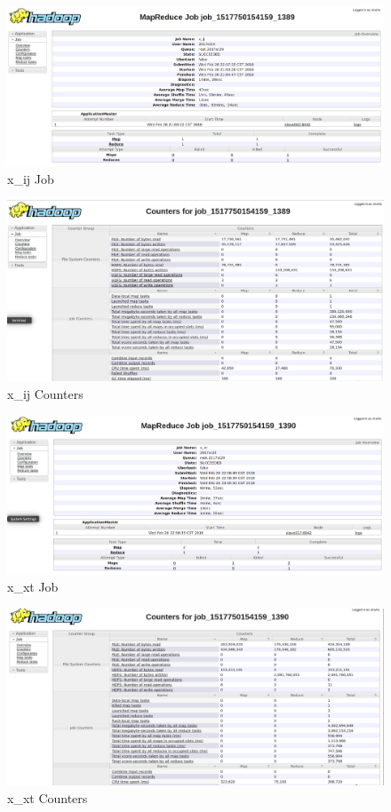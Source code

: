 \documentclass[a4paper,UTF8]{article}
\theoremstyle{definition}
\begin{document}
\begin{figure}[H]
	\centering
	\includegraphics[width=\textwidth]{pic/389_x_ij_job.png}
	\caption{x\_ij Job}
\end{figure}
\begin{figure}[H]
	\centering
	\includegraphics[width=\textwidth]{pic/389_x_ij_counters.png}
	\caption{x\_ij Counters}
\end{figure}

\begin{figure}[H]
	\centering
	\includegraphics[width=\textwidth]{pic/390_x_xt_job.png}
	\caption{x\_xt Job}
\end{figure}
\begin{figure}[H]
	\centering
	\includegraphics[width=\textwidth]{pic/390_x_xt_counters.png}
	\caption{x\_xt Counters}
\end{figure}
\end{document}
